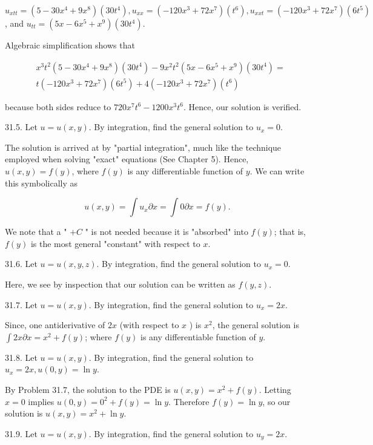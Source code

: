 \documentclass[10pt]{article}
\begin{document}
$u_{x t t}=\left(5-30 x^{4}+9 x^{8}\right)\left(30 t^{4}\right), u_{x x}=\left(-120 x^{3}+72 x^{7}\right)\left(t^{6}\right), u_{x x t}=\left(-120 x^{3}+72 x^{7}\right)\left(6 t^{5}\right)$, and $u_{t t}=\left(5 x-6 x^{5}+x^{9}\right)\left(30 t^{4}\right)$.

Algebraic simplification shows that

$$
\begin{aligned}
& x^{3} t^{2}\left(5-30 x^{4}+9 x^{8}\right)\left(30 t^{4}\right)-9 x^{2} t^{2}\left(5 x-6 x^{5}+x^{9}\right)\left(30 t^{4}\right)= \\
& t\left(-120 x^{3}+72 x^{7}\right)\left(6 t^{5}\right)+4\left(-120 x^{3}+72 x^{7}\right)\left(t^{6}\right)
\end{aligned}
$$

because both sides reduce to $720 x^{7} t^{6}-1200 x^{3} t^{6}$. Hence, our solution is verified.

31.5. Let $u=u(x, y)$. By integration, find the general solution to $u_{x}=0$.

The solution is arrived at by "partial integration", much like the technique employed when solving "exact" equations (See Chapter 5). Hence, $u(x, y)=f(y)$, where $f(y)$ is any differentiable function of $y$. We can write this symbolically as

$$
u(x, y)=\int u_{x} \partial x=\int 0 \partial x=f(y) .
$$

We note that a " $+C$ " is not needed because it is "absorbed" into $f(y)$; that is, $f(y)$ is the most general "constant" with respect to $x$.

31.6. Let $u=u(x, y, z)$. By integration, find the general solution to $u_{x}=0$.

Here, we see by inspection that our solution can be written as $f(y, z)$.

31.7. Let $u=u(x, y)$. By integration, find the general solution to $u_{x}=2 x$.

Since, one antiderivative of $2 x$ (with respect to $x$ ) is $x^{2}$, the general solution is $\int 2 x \partial x=x^{2}+f(y)$; where $f(y)$ is any differentiable function of $y$.

31.8. Let $u=u(x, y)$. By integration, find the general solution to $u_{x}=2 x, u(0, y)=\ln y$.

By Problem 31.7, the solution to the PDE is $u(x, y)=x^{2}+f(y)$. Letting $x=0$ implies $u(0, y)=0^{2}+f(y)=\ln y$. Therefore $f(y)=\ln y$, so our solution is $u(x, y)=x^{2}+\ln y$.

31.9. Let $u=u(x, y)$. By integration, find the general solution to $u_{y}=2 x$.
\end{document}
